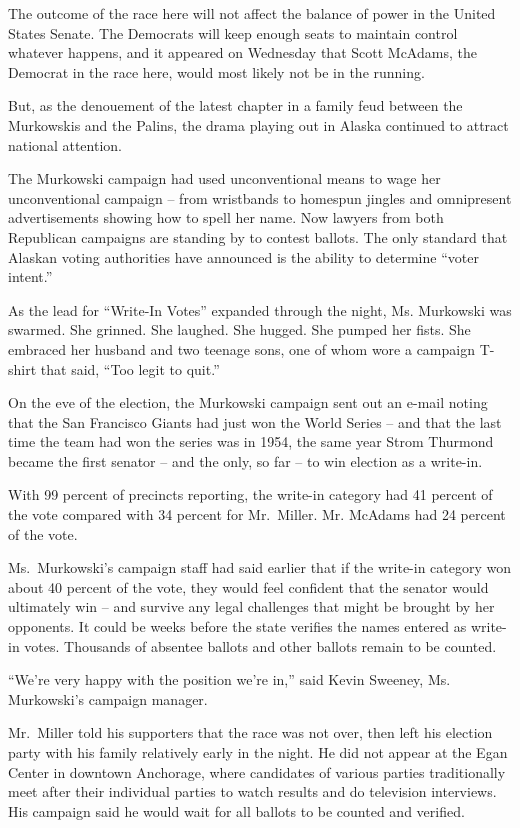 ﻿\documentclass[12pt]{article}
\begin{document}
The outcome of the race here will not affect the balance of power in the United States Senate. The
Democrats will keep enough seats to maintain control whatever happens, and it appeared on Wednesday
that Scott McAdams, the Democrat in the race here, would most likely not be in the running.

But, as the denouement of the latest chapter in a family feud between the Murkowskis and the Palins,
the drama playing out in Alaska continued to attract national attention.

The Murkowski campaign had used unconventional means to wage her unconventional campaign -- from
wristbands to homespun jingles and omnipresent advertisements showing how to spell her name. Now
lawyers from both Republican campaigns are standing by to contest ballots. The only standard that
Alaskan voting authorities have announced is the ability to determine ``voter intent.''

As the lead for ``Write-In Votes'' expanded through the night, Ms. Murkowski was swarmed. She
grinned. She laughed. She hugged. She pumped her fists. She embraced her husband and two teenage
sons, one of whom wore a campaign T-shirt that said, ``Too legit to quit.''

On the eve of the election, the Murkowski campaign sent out an e-mail noting that the San Francisco
Giants had just won the World Series -- and that the last time the team had won the series was in
1954, the same year Strom Thurmond became the first senator -- and the only, so far -- to win
election as a write-in.

With 99 percent of precincts reporting, the write-in category had 41 percent of the vote compared
with 34 percent for Mr.~Miller. Mr. McAdams had 24 percent of the vote.

Ms.~Murkowski's campaign staff had said earlier that if the write-in category won about 40 percent
of the vote, they would feel confident that the senator would ultimately win -- and survive any
legal challenges that might be brought by her opponents. It could be weeks before the state verifies
the names entered as write-in votes. Thousands of absentee ballots and other ballots remain to be
counted.

``We're very happy with the position we're in,'' said Kevin Sweeney, Ms. Murkowski's campaign
manager.

Mr.~Miller told his supporters that the race was not over, then left his election party with his
family relatively early in the night. He did not appear at the Egan Center in downtown Anchorage,
where candidates of various parties traditionally meet after their individual parties to watch
results and do television interviews. His campaign said he would wait for all ballots to be counted
and verified.
\end{document}
